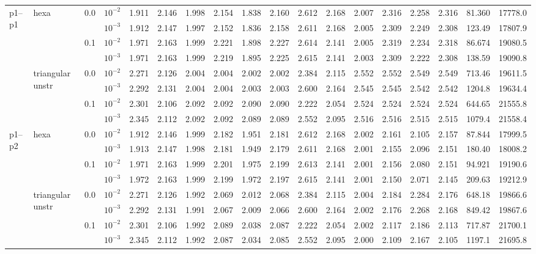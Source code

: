\begin{longtable}{llclrrrrrrrrrrrrrr}
\multirow{8}{*}{p1--p1} & \multirow{4}{*}{hexa} & \multirow{2}{*}{0.0} & $10^{-2}$ & 1.911 & 2.146 & 1.998 & 2.154 & 1.838 & 2.160 & 2.612 & 2.168 & 2.007 & 2.316 & 2.258 & 2.316 & 81.360 & 17778.0 \\
& & & $10^{-3}$ & 1.912 & 2.147 & 1.997 & 2.152 & 1.836 & 2.158 & 2.611 & 2.168 & 2.005 & 2.309 & 2.249 & 2.308 & 123.49 & 17807.9 \\\cline{3-18}
& & \multirow{2}{*}{0.1} & $10^{-2}$ & 1.971 & 2.163 & 1.999 & 2.221 & 1.898 & 2.227 & 2.614 & 2.141 & 2.005 & 2.319 & 2.234 & 2.318 & 86.674 & 19080.5 \\
& & & $10^{-3}$ & 1.971 & 2.163 & 1.999 & 2.219 & 1.895 & 2.225 & 2.615 & 2.141 & 2.003 & 2.309 & 2.222 & 2.308 & 138.59 & 19090.8 \\\cline{2-18}
& \multirow{4}{*}{triangular unstr} & \multirow{2}{*}{0.0} & $10^{-2}$ & 2.271 & 2.126 & 2.004 & 2.004 & 2.002 & 2.002 & 2.384 & 2.115 & 2.552 & 2.552 & 2.549 & 2.549 & 713.46 & 19611.5 \\
& & & $10^{-3}$ & 2.292 & 2.131 & 2.004 & 2.004 & 2.003 & 2.003 & 2.600 & 2.164 & 2.545 & 2.545 & 2.542 & 2.542 & 1204.8 & 19634.4 \\\cline{3-18}
& & \multirow{2}{*}{0.1} & $10^{-2}$ & 2.301 & 2.106 & 2.092 & 2.092 & 2.090 & 2.090 & 2.222 & 2.054 & 2.524 & 2.524 & 2.524 & 2.524 & 644.65 & 21555.8 \\
& & & $10^{-3}$ & 2.345 & 2.112 & 2.092 & 2.092 & 2.089 & 2.089 & 2.552 & 2.095 & 2.516 & 2.516 & 2.515 & 2.515 & 1079.4 & 21558.4 \\\hline

\multirow{8}{*}{p1--p2} & \multirow{4}{*}{hexa} & \multirow{2}{*}{0.0} & $10^{-2}$ & 1.912 & 2.146 & 1.999 & 2.182 & 1.951 & 2.181 & 2.612 & 2.168 & 2.002 & 2.161 & 2.105 & 2.157 & 87.844 & 17999.5 \\
& & & $10^{-3}$ & 1.913 & 2.147 & 1.998 & 2.181 & 1.949 & 2.179 & 2.611 & 2.168 & 2.001 & 2.155 & 2.096 & 2.151 & 180.40 & 18008.2 \\\cline{3-18}
& & \multirow{2}{*}{0.1} & $10^{-2}$ & 1.971 & 2.163 & 1.999 & 2.201 & 1.975 & 2.199 & 2.613 & 2.141 & 2.001 & 2.156 & 2.080 & 2.151 & 94.921 & 19190.6 \\
& & & $10^{-3}$ & 1.972 & 2.163 & 1.999 & 2.199 & 1.972 & 2.197 & 2.615 & 2.141 & 2.001 & 2.150 & 2.071 & 2.145 & 209.63 & 19212.9 \\\cline{2-18}
& \multirow{4}{*}{triangular unstr} & \multirow{2}{*}{0.0} & $10^{-2}$ & 2.271 & 2.126 & 1.992 & 2.069 & 2.012 & 2.068 & 2.384 & 2.115 & 2.004 & 2.184 & 2.284 & 2.176 & 648.18 & 19866.6 \\
& & & $10^{-3}$ & 2.292 & 2.131 & 1.991 & 2.067 & 2.009 & 2.066 & 2.600 & 2.164 & 2.002 & 2.176 & 2.268 & 2.168 & 849.42 & 19867.6 \\\cline{3-18}
& & \multirow{2}{*}{0.1} & $10^{-2}$ & 2.301 & 2.106 & 1.992 & 2.089 & 2.038 & 2.087 & 2.222 & 2.054 & 2.002 & 2.117 & 2.186 & 2.113 & 717.87 & 21700.1 \\
& & & $10^{-3}$ & 2.345 & 2.112 & 1.992 & 2.087 & 2.034 & 2.085 & 2.552 & 2.095 & 2.000 & 2.109 & 2.167 & 2.105 & 1197.1 & 21695.8 \\\hline


\end{longtable}

